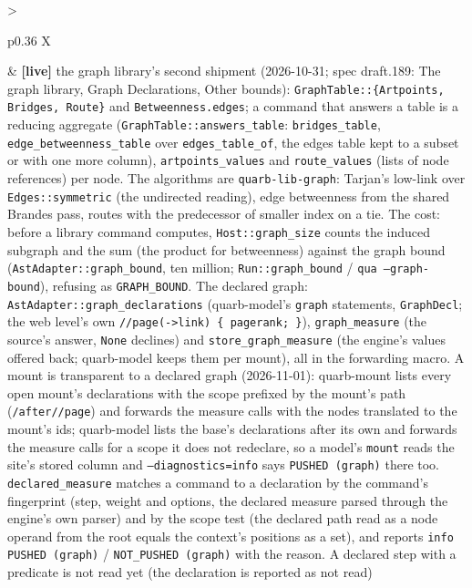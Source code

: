 \documentclass{report}
\newcommand{\live}{\textbf{\textcolor{blue!60!black}{[live]}}\xspace}
\begin{document}
\begin{xltabular}{\textwidth}{>{\raggedright\arraybackslash}p{0.36\textwidth} X}
  & \live the graph library's second shipment (2026-10-31; spec
    draft.189: The graph library, Graph Declarations, Other bounds):
    \texttt{GraphTable::\{Artpoints, Bridges, Route\}} and
    \texttt{Betweenness.edges}; a command that answers a table is
    a reducing aggregate (\texttt{GraphTable::answers\_table}:
    \texttt{bridges\_table}, \texttt{edge\_betweenness\_table} over
    \texttt{edges\_table\_of}, the edges table kept to a subset or
    with one more column), \texttt{artpoints\_values} and
    \texttt{route\_values} (lists of node references) per node. The
    algorithms are \texttt{quarb-lib-graph}: Tarjan's low-link over
    \texttt{Edges::symmetric} (the undirected reading), edge
    betweenness from the shared Brandes pass, routes with the
    predecessor of smaller index on a tie. The cost: before a
    library command computes, \texttt{Host::graph\_size} counts the
    induced subgraph and the sum (the product for betweenness)
    against the graph bound (\texttt{AstAdapter::graph\_bound},
    ten million; \texttt{Run::graph\_bound} /
    \texttt{qua --graph-bound}), refusing as \texttt{GRAPH\_BOUND}.
    The declared graph: \texttt{AstAdapter::graph\_declarations}
    (quarb-model's \texttt{graph} statements, \texttt{GraphDecl}; the
    web level's own \texttt{//page(->link) \{ pagerank; \}}),
    \texttt{graph\_measure} (the source's answer, \texttt{None}
    declines) and \texttt{store\_graph\_measure} (the engine's
    values offered back; quarb-model keeps them per mount), all in
    the forwarding macro. A mount is transparent to a declared
    graph (2026-11-01): quarb-mount lists every open mount's
    declarations with the scope prefixed by the mount's path
    (\texttt{/after//page}) and forwards the measure calls with
    the nodes translated to the mount's ids; quarb-model lists the
    base's declarations after its own and forwards the measure
    calls for a scope it does not redeclare, so a model's
    \texttt{mount} reads the site's stored column and
    \texttt{--diagnostics=info} says \texttt{PUSHED (graph)} there too. \texttt{declared\_measure} matches a
    command to a declaration by the command's fingerprint (step,
    weight and options, the declared measure parsed through the
    engine's own parser) and by the scope test (the declared path
    read as a node operand from the root equals the context's
    positions as a set), and reports \texttt{info PUSHED (graph)} /
    \texttt{NOT\_PUSHED (graph)} with the reason. A declared step with
    a predicate is not read yet (the declaration is reported as not
    read) \\

\end{xltabular}
\end{document}

